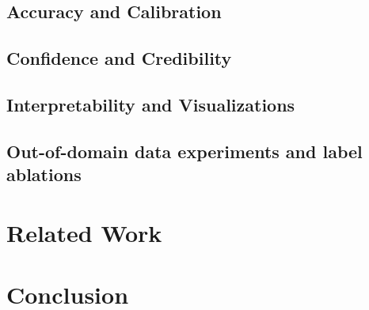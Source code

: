 \documentclass[11pt,letterpaper]{article}
\begin{document}
\subsection{Accuracy and Calibration}
\subsection{Confidence and Credibility}
\subsection{Interpretability and Visualizations}
\subsection{Out-of-domain data experiments and label ablations}

\section{Related Work}

\section{Conclusion}

\newpage

\label{lastpage}
\end{document}
